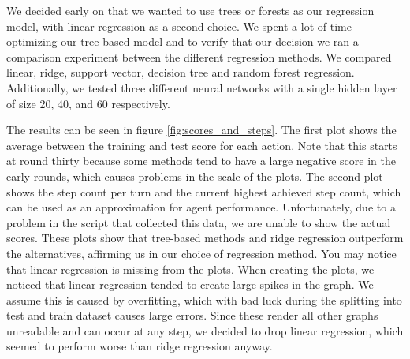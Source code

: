 \documentclass{article}
\begin{document}
We decided early on that we wanted to use trees or forests as our regression model, with linear regression as a second choice. We spent a lot of time optimizing our tree-based model and to verify that our decision we ran a comparison experiment between the different regression methods. We compared linear, ridge, support vector, decision tree and random forest regression. Additionally, we tested three different neural networks with a single hidden layer of size 20, 40, and 60 respectively. 

The results can be seen in figure \ref{fig:scores_and_steps}. The first plot shows the average between the training and test score for each action. Note that this starts at round thirty because some methods tend to have a large negative score in the early rounds, which causes problems in the scale of the plots. The second plot shows the step count per turn and the current highest achieved step count, which can be used as an approximation for agent performance. Unfortunately, due to a problem in the script that collected this data, we are unable to show the actual scores. These plots show that tree-based methods and ridge regression outperform the alternatives, affirming us in our choice of regression method. You may notice that linear regression is missing from the plots. When creating the plots, we noticed that linear regression tended to create large spikes in the graph. We assume this is caused by overfitting, which with bad luck during the splitting into test and train dataset causes large errors. Since these render all other graphs unreadable and can occur at any step, we decided to drop linear regression, which seemed to perform worse than ridge regression anyway.
\end{document}
